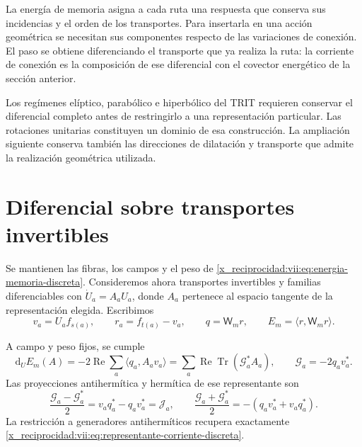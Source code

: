 La energía de memoria asigna a cada ruta una respuesta que conserva sus
incidencias y el orden de los transportes. Para insertarla en una acción
geométrica se necesitan sus componentes respecto de las variaciones de
conexión. El paso se obtiene diferenciando el transporte que ya realiza
la ruta: la corriente de conexión es la composición de ese diferencial
con el covector energético de la sección anterior.

Los regímenes elíptico, parabólico e hiperbólico del TRIT requieren
conservar el diferencial completo antes de restringirlo a una
representación particular. Las rotaciones unitarias constituyen un
dominio de esa construcción. La ampliación siguiente conserva también
las direcciones de dilatación y transporte que admite la realización
geométrica utilizada.

\section{Diferencial sobre transportes invertibles}

Se mantienen las fibras, los campos y el peso de
\eqref{x_reciprocidad:vii:eq:energia-memoria-discreta}. Consideremos ahora transportes
invertibles y familias diferenciables con
\(\dot U_a=A_aU_a\), donde \(A_a\) pertenece al espacio tangente
de la representación elegida. Escribimos
\[
 v_a=U_af_{s(a)},\qquad r_a=f_{t(a)}-v_a,\qquad
 q=\mathsf W_mr,\qquad E_m=\langle r,\mathsf W_mr\rangle.
\]

\begin{proposition}
\label{x_reciprocidad:vii:prop:diferencial-invertible}
A campo y peso fijos, se cumple
\begin{equation}
 \mathrm d_UE_m(A)=-2\operatorname{Re}\sum_a
       \langle q_a,A_av_a\rangle
 =\sum_a\operatorname{Re}\operatorname{Tr}(\mathcal G_a^*A_a),
 \qquad \mathcal G_a=-2q_av_a^*.
 \label{x_reciprocidad:vii:eq:gradiente-transporte-completo}
\end{equation}
Las proyecciones antihermítica y hermítica de ese representante son
\begin{equation}
 \frac{\mathcal G_a-\mathcal G_a^*}{2}
   =v_aq_a^*-q_av_a^*=\mathcal J_a,
 \qquad
 \frac{\mathcal G_a+\mathcal G_a^*}{2}
   =-(q_av_a^*+v_aq_a^*).
 \label{x_reciprocidad:vii:eq:proyecciones-gradiente-memoria}
\end{equation}
La restricción a generadores antihermíticos recupera exactamente
\eqref{x_reciprocidad:vii:eq:representante-corriente-discreta}.
\end{proposition}

